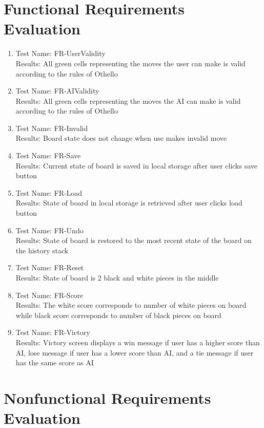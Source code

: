 \documentclass[12pt, titlepage]{article}
\begin{document}
\section{Functional Requirements Evaluation}
\begin{enumerate}
	\item Test Name: FR-UserValidity\\
	      Results: All green cells representing the moves the user can make is valid according to the rules of Othello
	\item Test Name: FR-AIValidity\\
	      Results: All green cells representing the moves the AI can make is valid according to the rules of Othello
	\item Test Name: FR-Invalid\\
	      Results: Board state does not change when use makes invalid move
	\item Test Name: FR-Save\\
	      Results: Current state of board is saved in local storage after user clicks save button
	\item Test Name: FR-Load\\
	      Results: State of board in local storage is retrieved after user clicks load button
	\item Test Name: FR-Undo\\
	      Results: State of board is restored to the most recent state of the board on the history stack
	\item Test Name: FR-Reset\\
	      Results: State of board is 2 black and white pieces in the middle
	\item Test Name: FR-Score\\
	      Results: The white score corresponds to number of white pieces on board while black score corresponds to number of black pieces on board
	\item Test Name: FR-Victory\\
	      Results: Victory screen displays a win message if user has a higher score than AI, lose message if user has a lower score than AI, and a tie message if user has the same score as AI
\end{enumerate}

\section{Nonfunctional Requirements Evaluation}
\end{document}
